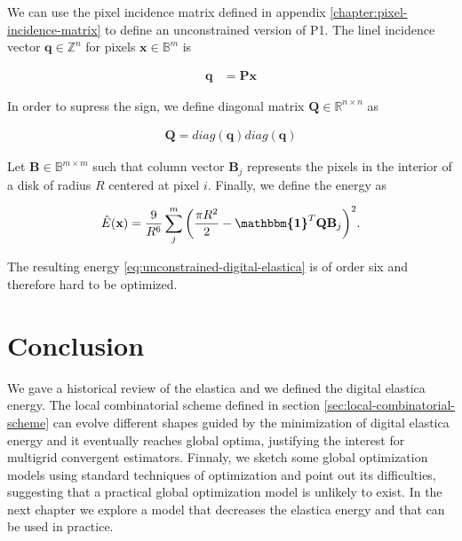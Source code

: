 We can use the pixel incidence matrix defined in appendix \ref{chapter:pixel-incidence-matrix} to define an unconstrained version of P1. The linel incidence vector $\mathbf{q} \in \mathbb{Z}^n$ for pixels $\mathbf{x} \in \mathbb{B}^{m}$ is 
	
	\begin{align*}
		\mathbf{q} &= \mathbf{P} \mathbf{x}
	\end{align*}

In order to supress the sign, we define diagonal matrix $\mathbf{Q} \in \mathbb{R}^{n \times n }$ as

\begin{align*}
	\mathbf{Q} = diag(\mathbf{q})diag(\mathbf{q})
\end{align*}

Let $\mathbf{B} \in \mathbb{B}^{m\times m}$ such that column vector $\mathbf{B}_j$ represents the pixels in the interior of a disk of radius $R$ centered at pixel $i$. Finally, we define the energy as

\begin{align}
	\hat{E}(\mathbf{x}) = \frac{9}{R^6}\sum_{j}^{m}{\left( \frac{\pi R^2}{2} - \boldsymbol{\mathbbm{1}}^T{\mathbf{Q}}\mathbf{B}_j \right)^2}.
	\label{eq:unconstrained-digital-elastica}
\end{align}


The resulting energy \eqref{eq:unconstrained-digital-elastica} is of order six and therefore hard to be optimized.

\section{Conclusion}
We gave a historical review of the elastica and we defined the digital elastica energy. The local combinatorial scheme defined in section \ref{sec:local-combinatorial-scheme} can evolve different shapes guided by the minimization of digital elastica energy and it eventually reaches global optima, justifying the interest for multigrid convergent estimators. Finnaly, we sketch some global optimization models using standard techniques of optimization and point out its difficulties, suggesting that a practical global optimization model is unlikely to exist. In the next chapter we explore a model that decreases the elastica energy and that can be used in practice.

